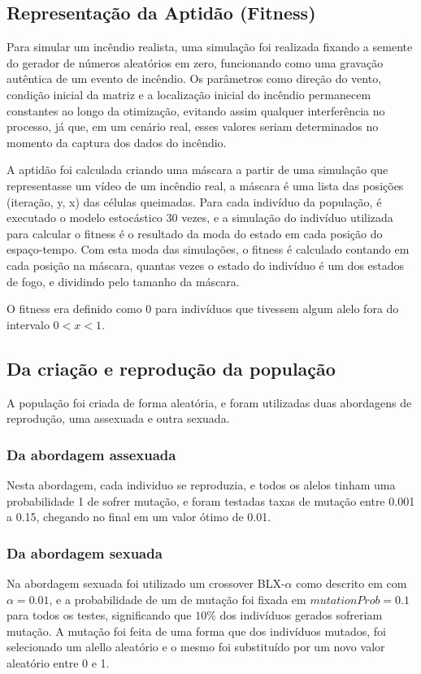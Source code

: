\documentclass[12pt]{article}
\begin{document}
\subsection{Representação da Aptidão (Fitness)}
Para simular um incêndio realista, uma simulação foi realizada fixando a semente do gerador de números aleatórios em zero, funcionando como uma gravação autêntica de um evento de incêndio. Os parâmetros como direção do vento, condição inicial da matriz e a localização inicial do incêndio permanecem constantes ao longo da otimização, evitando assim qualquer interferência no processo, já que, em um cenário real, esses valores seriam determinados no momento da captura dos dados do incêndio.

A aptidão foi calculada criando uma máscara a partir de uma simulação que representasse um vídeo de um incêndio real, a máscara é uma lista das posições (iteração, y, x) das células queimadas. Para cada indivíduo da população, é executado o modelo estocástico 30 vezes, e a simulação do indivíduo utilizada para calcular o fitness é o resultado da moda do estado em cada posição do espaço-tempo. Com esta moda das simulações, o fitness é calculado contando em cada posição na máscara, quantas vezes o estado do indivíduo é um dos estados de fogo, e dividindo pelo tamanho da máscara.

O fitness era definido como 0 para indivíduos que tivessem algum alelo fora do intervalo \(0<x<1\).
\subsection{Da criação e reprodução da população}
A população foi criada de forma aleatória, e foram utilizadas duas abordagens de reprodução, uma assexuada e outra sexuada.
\subsubsection{Da abordagem assexuada}
Nesta abordagem, cada individuo se reproduzia, e todos os alelos tinham uma probabilidade 1 de sofrer mutação, e foram testadas taxas de mutação entre 0.001 a 0.15, chegando no final em um valor ótimo de 0.01.
\subsubsection{Da abordagem sexuada}
Na abordagem sexuada foi utilizado um crossover BLX-$\alpha$  como descrito em \cite{de2002tutorial} com $\alpha=0.01$, e a probabilidade de um  de mutação foi fixada em $mutationProb=0.1$ para todos os testes, significando que $10\%$ dos indivíduos gerados sofreriam mutação. A mutação foi feita de uma forma que dos indivíduos mutados, foi selecionado um alello aleatório e o mesmo foi substituído por um novo valor aleatório entre 0 e 1.
\end{document}
